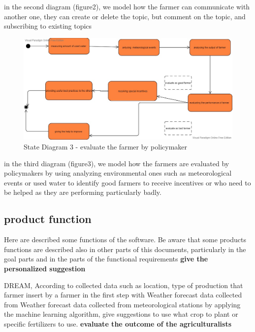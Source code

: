 in the second diagram (figure2), we model how the farmer can communicate with another one,
they can create or delete the  topic, but comment on the topic, and subscribing to existing topics


 \begin{figure}[H]
\includegraphics[width=1\textwidth]{figures/thirdStateDiagram.jpg}
\caption{\label{fig:student } State Diagram 3 - evaluate the farmer by policymaker }
\end{figure}
in the third diagram (figure3), we model how the farmers are evaluated by policymakers by using analyzing environmental ones such as meteorological events or used water to identify good farmers to receive incentives or who need to be helped as they are performing particularly badly. 


\pagebreak
\subsection{product function}
Here are described some functions of the software. Be aware that some products functions are described also in other parts of this documents, particularly in the goal parts and in the parts of the functional requirements
 \newline
 \newline
\textbf{give the personalized suggestion}

DREAM, According to collected data such as location, type of production that farmer insert by a farmer in the first step with Weather forecast data collected from
Weather forecast data collected from meteorological stations
by applying the machine learning algorithm, give suggestions to use what crop to plant or specific fertilizers to use.
 \newline
 \newline
\textbf{evaluate the outcome of the agriculturalists}

